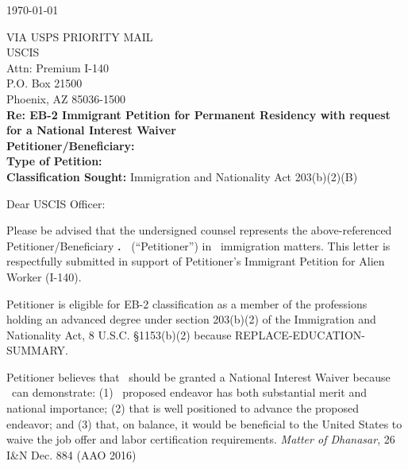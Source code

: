 \documentclass{pl_template}  %
\begin{document}
\firstpageheader


\begin{center}
    \today
\end{center}

\vspace{2em}
\raggedright{  %
VIA USPS PRIORITY MAIL\\
USCIS\\
Attn: Premium I-140\\
P.O. Box 21500\\ 
Phoenix, AZ 85036-1500\\
\vspace{2em}
\textbf{Re: EB-2 Immigrant Petition for Permanent Residency with request for a National Interest Waiver} \\
\textbf{Petitioner/Beneficiary:} \Petitioner\\
\textbf{Type of Petition:} \TypeOfPetitionShort\\
\textbf{Classification Sought:}  Immigration and Nationality Act 203(b)(2)(B) \\
}

\vspace{3em}

\noindent Dear USCIS Officer:

\hspace*{2em} Please be advised that the undersigned counsel represents the above-referenced Petitioner/Beneficiary \textbf{\MrMs.\  \Petitioner} (“Petitioner”) in \HisHerLow \   immigration matters. This letter is respectfully submitted in support of Petitioner’s Immigrant Petition for Alien Worker (I-140).

\hspace*{2em}Petitioner is eligible for EB-2 classification as a member of the professions holding an advanced degree under section 203(b)(2) of the Immigration and Nationality Act, 8 U.S.C. §1153(b)(2) because REPLACE-EDUCATION-SUMMARY.

\hspace*{2em}Petitioner believes that \HeSheLow \ should be granted a National Interest Waiver because \HeSheLow \  can demonstrate: (1) \HisHerLow \  proposed endeavor has both substantial merit and national importance; (2) that \HeSheLow is well positioned to advance the proposed endeavor; and (3) that, on balance, it would be beneficial to the United States to waive the job offer and labor certification requirements. \textit{Matter of Dhanasar}, 26 I\&N Dec. 884 (AAO 2016)
\end{document}

